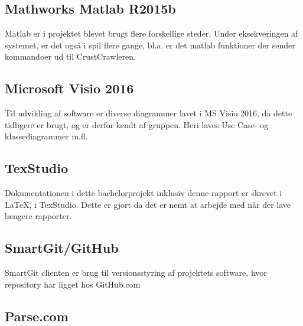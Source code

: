 \subsection{Mathworks Matlab R2015b}
Matlab er i projektet blevet brugt flere forskellige steder. Under eksekveringen af systemet, er det også i spil flere gange, bl.a. er det matlab funktioner der sender kommandoer ud til CrustCrawleren.

\subsection{Microsoft Visio 2016}

Til udvikling af software er diverse diagrammer lavet i MS Visio 2016, da dette tidligere er brugt, og er derfor kendt af gruppen. Heri laves Use Case- og klassediagrammer m.fl.

\subsection{TexStudio}
Dokumentationen i dette bachelorprojekt inklusiv denne rapport er skrevet i \LaTeX, i TexStudio. Dette er gjort da det er nemt at arbejde med når der lave længere rapporter.

\subsection{SmartGit/GitHub}
SmartGit clienten er brug til versionsstyring af projektets software, hvor repository har ligget hos GitHub.com

\subsection{Parse.com}


